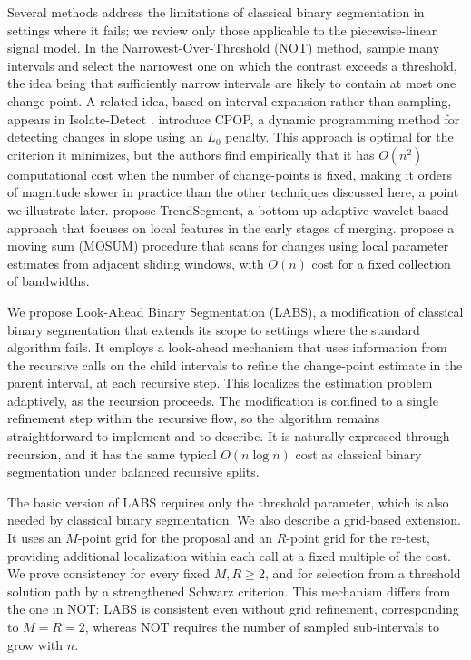 \documentclass[12pt, a4paper]{article}
\begin{document}
Several methods address the limitations of classical binary segmentation in settings where it fails; we review only those applicable to the piecewise-linear signal model. In the Narrowest-Over-Threshold (NOT) method, \cite{bcf16} sample many intervals and select the narrowest one on which the contrast exceeds a threshold, the idea being that sufficiently narrow intervals are likely to contain at most one change-point. A related idea, based on interval expansion rather than sampling, appears in Isolate-Detect \citep[ID;][]{af22}.
\cite{mfl19} introduce CPOP, a dynamic programming method for detecting changes in slope using an $L_0$ penalty. This approach is optimal for the criterion it minimizes, but the authors find empirically that it has $O(n^2)$ computational cost when the number of change-points is fixed, making it orders of magnitude slower in practice than the other techniques discussed here, a point we illustrate later.
\cite{mf23} propose TrendSegment, a bottom-up adaptive wavelet-based approach that focuses on local features in the early stages of merging. 
\cite{koc24} propose a moving sum (MOSUM) procedure that scans for changes using local parameter estimates from adjacent sliding windows, with $O(n)$ cost for a fixed collection of bandwidths.

We propose Look-Ahead Binary Segmentation (LABS), a modification of classical binary segmentation that extends its scope to settings where the standard algorithm fails. It employs a look-ahead mechanism that uses information from the recursive calls on the child intervals to refine the change-point estimate in the parent interval, at each recursive step. This localizes the estimation problem adaptively, as the recursion proceeds. The modification is confined to a single refinement step within the recursive flow, so the algorithm remains straightforward to implement and to describe. It is naturally expressed through recursion, and it has the same typical $O(n \log n)$ cost as classical binary segmentation under balanced recursive splits.

The basic version of LABS requires only the threshold parameter, which is also needed by classical binary segmentation. We also describe a grid-based extension. It uses an $M$-point grid for the proposal and an $R$-point grid for the re-test, providing additional localization within each call at a fixed multiple of the cost. We prove consistency for every fixed $M,R \geq 2$, and for selection from a threshold solution path by a strengthened Schwarz criterion. This mechanism differs from the one in NOT: LABS is consistent even without grid refinement, corresponding to $M=R=2$, whereas NOT requires the number of sampled sub-intervals to grow with $n$.
\end{document}

